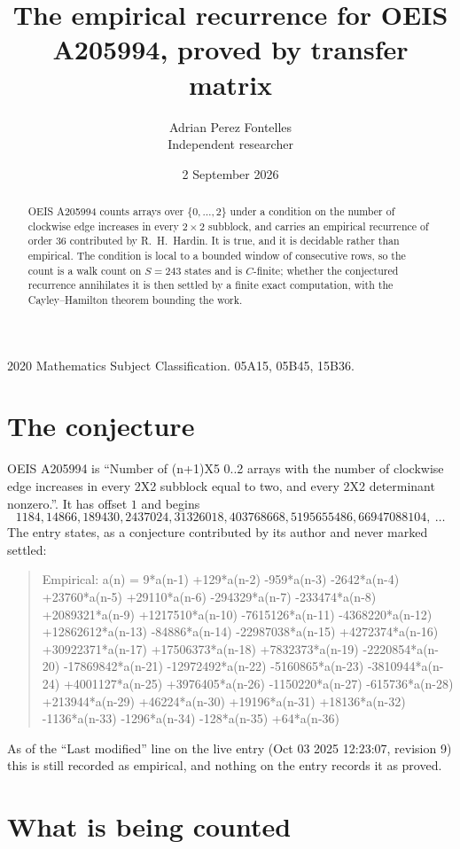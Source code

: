 \documentclass[11pt,a4paper]{article}
\title{The empirical recurrence for OEIS A205994, proved by transfer matrix}
\author{Adrian Perez Fontelles\\ \small Independent researcher}
\date{2 September 2026}
\theoremstyle{plain}
\theoremstyle{definition}
\begin{document}
\maketitle

\begin{abstract}
OEIS A205994 counts arrays over $\{0,\dots,2\}$ under a condition on the number of clockwise edge increases
in every $2\times2$ subblock, and carries an empirical recurrence of order $36$ contributed by
R.~H.~Hardin. It is true, and it is decidable rather than empirical. The condition is local to
a bounded window of consecutive rows, so the count is a walk count on $S=243$ states and is
$C$-finite; whether the conjectured recurrence annihilates it is then settled by a finite exact
computation, with the Cayley--Hamilton theorem bounding the work.
\end{abstract}

\noindent\small 2020 Mathematics Subject Classification. 05A15, 05B45, 15B36.\normalsize

\section{The conjecture}

OEIS A205994 is ``Number of (n+1)X5 0..2 arrays with the number of clockwise edge increases in every 2X2 subblock equal to two, and every 2X2 determinant nonzero.''. It has offset $1$ and begins
\[
1184, 14866, 189430, 2437024, 31326018, 403768668, 5195655486, 66947088104,\ \dots
\]
The entry states, as a conjecture contributed by its author and never marked settled:
\begin{quote}
Empirical: a(n) = 9*a(n-1) +129*a(n-2) -959*a(n-3) -2642*a(n-4) +23760*a(n-5) +29110*a(n-6) -294329*a(n-7) -233474*a(n-8) +2089321*a(n-9) +1217510*a(n-10) -7615126*a(n-11) -4368220*a(n-12) +12862612*a(n-13) -84886*a(n-14) -22987038*a(n-15) +4272374*a(n-16) +30922371*a(n-17) +17506373*a(n-18) +7832373*a(n-19) -2220854*a(n-20) -17869842*a(n-21) -12972492*a(n-22) -5160865*a(n-23) -3810944*a(n-24) +4001127*a(n-25) +3976405*a(n-26) -1150220*a(n-27) -615736*a(n-28) +213944*a(n-29) +46224*a(n-30) +19196*a(n-31) +18136*a(n-32) -1136*a(n-33) -1296*a(n-34) -128*a(n-35) +64*a(n-36)
\end{quote}
As of the ``Last modified'' line on the live entry (Oct 03 2025 12:23:07, revision 9) this is still
recorded as empirical, and nothing on the entry records it as proved.

\section{What is being counted}
\end{document}
